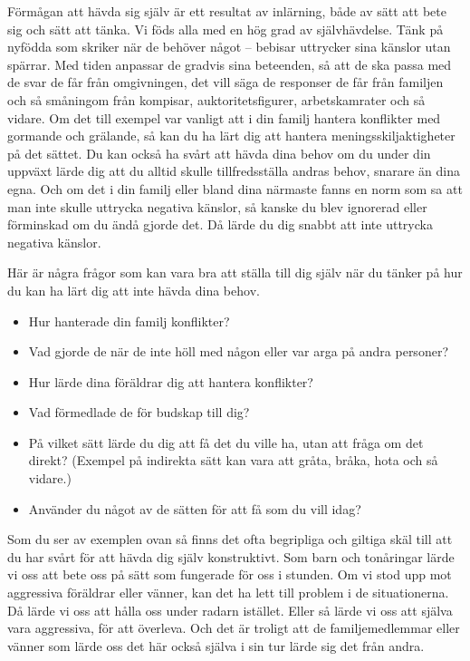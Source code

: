 \documentclass[swedish,a4paper]{book}
\begin{document}
Förmågan att hävda sig själv är ett resultat av inlärning, både av sätt
att bete sig och sätt att tänka. Vi föds alla med en hög grad av
självhävdelse. Tänk på nyfödda som skriker när de behöver något --
bebisar uttrycker sina känslor utan spärrar. Med tiden anpassar de
gradvis sina beteenden, så att de ska passa med de svar de får från
omgivningen, det vill säga de responser de får från familjen och så
småningom från kompisar, auktoritetsfigurer, arbetskamrater och så
vidare. Om det till exempel var vanligt att i din familj hantera
konflikter med gormande och grälande, så kan du ha lärt dig att hantera
meningsskiljaktigheter på det sättet. Du kan också ha svårt att hävda
dina behov om du under din uppväxt lärde dig att du alltid skulle tillfredsställa
andras behov, snarare än dina egna. Och om det i din
familj eller bland dina närmaste fanns en norm som sa att man inte skulle
uttrycka negativa känslor, så kanske du blev ignorerad eller förminskad om du ändå gjorde det. Då lärde du dig snabbt att inte uttrycka negativa
känslor.

Här är några frågor som kan vara bra att ställa till dig själv när du
tänker på hur du kan ha lärt dig att inte hävda dina behov.

\begin{itemize}
\item
  Hur hanterade din familj konflikter?
\item
  Vad gjorde de när de inte höll med någon eller var arga på andra
  personer?
\item
  Hur lärde dina föräldrar dig att hantera konflikter?
\item
  Vad förmedlade de för budskap till dig?
\item
  På vilket sätt lärde du dig att få det du ville ha, utan att fråga om
  det direkt? (Exempel på indirekta sätt kan vara att gråta, bråka, hota
  och så vidare.)
\item
  Använder du något av de sätten för att få som du vill idag?
\end{itemize}

Som du ser av exemplen ovan så finns det ofta begripliga och giltiga
skäl till att du har svårt för att hävda dig själv konstruktivt. Som
barn och tonåringar lärde vi oss att bete oss på sätt som fungerade för
oss i stunden. Om vi stod upp mot aggressiva föräldrar eller vänner, 
kan det ha lett till problem i de situationerna. Då lärde vi oss att hålla oss under
radarn istället. Eller så lärde vi oss att själva vara aggressiva, för att
överleva. Och det är troligt att de familjemedlemmar eller vänner
som lärde oss det här också själva i sin tur lärde sig det från andra.
\end{document}
